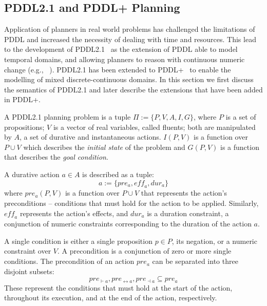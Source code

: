\subsection{PDDL2.1 and PDDL+ Planning}

Application of planners in real world problems has challenged the limitations of PDDL and increased the necessity of dealing with time and resources. This lead to the development of PDDL2.1~\cite{fox03} as the extension of PDDL able to model temporal domains, and allowing planners to reason with continuous numeric change (e.g., ~\cite{coles2012colin, coles2013hybrid}). PDDL2.1 has been extended to PDDL+~\cite{pddl+} to enable the modelling of mixed discrete-continuous domains. In this section we first discuss the semantics of PDDL2.1 and later describe the extensions that have been added in PDDL+.

\begin{definition}\label{def:pddl21}
A PDDL2.1 planning problem is a tuple $\Pi:=\{P,V,A,I,G\}$, where $P$ is a set of propositions; $V$ is a vector of real variables, called fluents; both are manipulated by $A$, a set of durative and instantaneous actions.
$I(P,V)$ is a function over $P\cup V$ which describes the \textit{initial state} of the problem and $G(P,V)$ is a function that describes the \textit{goal condition}.
\end{definition}

A durative action $a \in A$ is described as a tuple:
$$
a:=\{pre_{a},\mathit{eff}_{a},dur_{a}\}
$$
where $pre_{a}(P,V)$ is a function over $P\cup V$ that represents the action's preconditions -- conditions that must hold for the action to be applied. Similarly, $\mathit{eff}_{a}$ represents the action's effects, and $dur_{a}$ is a duration constraint, a conjunction of numeric constraints corresponding to the duration of the action $a$.

A single condition is either a single proposition $p\in P$, its negation, or a numeric constraint over $V$. A precondition is a conjunction of zero or more single conditions. The precondition of an action $pre_a$ can be separated into three disjoint subsets:
$$
pre_{\vdash a}, pre_{\leftrightarrow a}, pre_{\dashv a}\subseteq pre_{a}
$$
These represent the conditions that must hold at the start of the action, throughout its execution, and at the end of the action, respectively.

